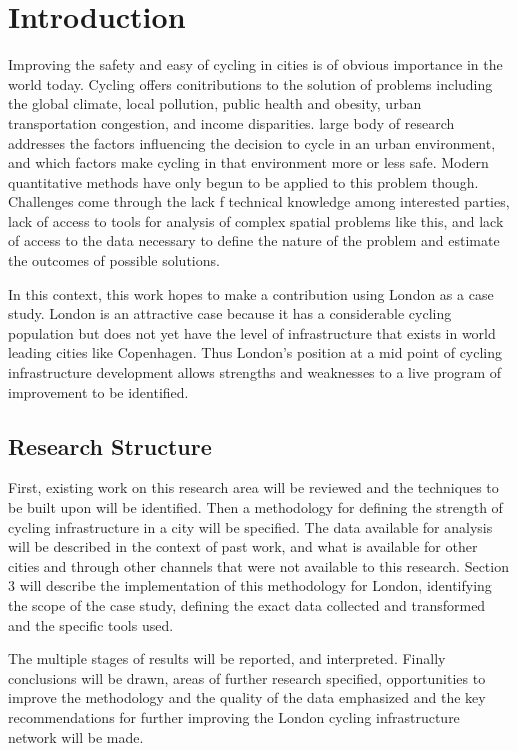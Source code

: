 \documentclass[11pt]{article} %
\begin{document}
\section{Introduction}

Improving the safety and easy of cycling in cities is of obvious importance in the world today. Cycling offers conitributions to the solution of problems including the global climate, local pollution, public health and obesity, urban transportation congestion, and income disparities.  large body of research addresses the factors influencing the decision to cycle in an urban environment, and which factors make cycling in that environment more or less safe. Modern quantitative methods have only begun to be applied to this problem though. Challenges come through the lack f technical knowledge among interested parties, lack of access to tools for analysis of complex spatial problems like this, and lack of access to the data necessary to define the nature of the problem and estimate the outcomes of possible solutions. 

In this context, this work hopes to make a contribution using London as a case study. London is an attractive case because it has a considerable cycling population but does not yet have the level of infrastructure that exists in world leading cities like Copenhagen. Thus London's position at a mid point of cycling infrastructure development allows strengths and weaknesses to a live program of improvement to be identified. 

\subsection{Research Structure}

First, existing work on this research area will be reviewed and the techniques to be built upon will be identified.  Then a methodology for defining the strength of cycling infrastructure in a city will be specified. The data available for analysis will be described in the context of past work, and what is available for other cities and through other channels that were not available to this research. Section 3 will describe the implementation of this methodology for London, identifying the scope of the case study, defining the exact data collected and transformed and the specific tools used. 

The multiple stages of results will be reported, and interpreted. Finally conclusions will be drawn, areas of further research specified, opportunities to improve the methodology and the quality of the data emphasized and the key recommendations for further improving the London cycling infrastructure network will be made. 
\end{document}
